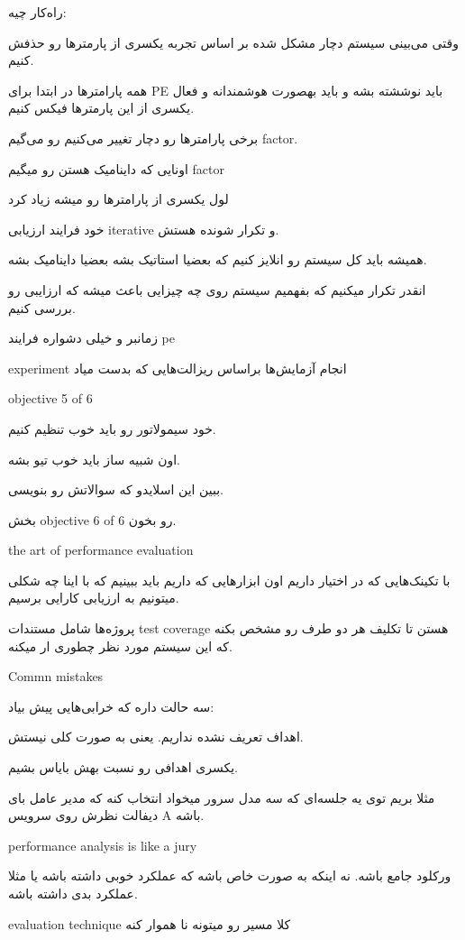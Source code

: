 راه‌کار چیه:

وقتی می‌بینی سیستم دچار مشکل شده بر اساس تجربه یکسری از پارمتر‌ها رو حذفش کنیم.

همه پارامتر‌ها در ابتدا برای PE باید نوششته بشه و باید بهصورت هوشمندانه و فعال
یکسری از این پارمتر‌ها فیکس کنیم.

برخی پارامتر‌ها رو دچار تغییر می‌کنیم رو می‌گیم factor.

اونایی که داینامیک هستن رو میگیم factor

لول یکسری از پارامتر‌ها رو میشه زیاد کرد 

خود فرایند‌ ارزیابی iterative و تکرار شونده هستش.

همیشه باید کل سیستم رو انلایز کنیم که بعضیا استاتیک بشه بعضیا داینامیک بشه.

انقدر تکرار میکنیم که بفهمیم سیستم روی چه چیزایی باعث میشه که ارزایبی رو بررسی کنیم.

زمانبر و خیلی دشواره فرایند pe

experiment انجام آزمایش‌ها براساس ریزالت‌هایی که بدست میاد

objective 5 of 6

خود سیمولاتور رو باید خوب  تنظیم کنیم. 

اون شبیه ساز باید خوب تیو بشه.

ببین این اسلایدو که سوالاتش رو بنویسی.

بخش objective 6 of 6 رو بخون.

the art of performance evaluation

با تکینک‌هایی که در اختیار داریم اون ابزار‌هایی که داریم باید ببینیم که با اینا
چه شکلی میتونیم به ارزیابی کارایی برسیم.

پروژه‌ها شامل مستندات test coverage هستن تا تکلیف هر دو طرف رو مشخص بکنه که این
سیستم مورد نظر چطوری ار میکنه.


Commn mistakes

سه حالت داره که خرابی‌هایی پیش بیاد:

اهداف تعریف نشده نداریم. یعنی به صورت کلی نیستش.

یکسری اهدافی رو نسبت بهش بایاس بشیم.

مثلا بریم توی یه جلسه‌ای که سه مدل سرور میخواد انتخاب کنه که مدیر عامل بای
دیفالت نظرش روی سرویس A باشه.

performance analysis is like a jury

ورکلود جامع باشه. نه اینکه به صورت خاص باشه که عملکرد خوبی داشته باشه یا مثلا
عملکرد بدی داشته باشه.

evaluation technique کلا مسیر رو میتونه نا هموار کنه


